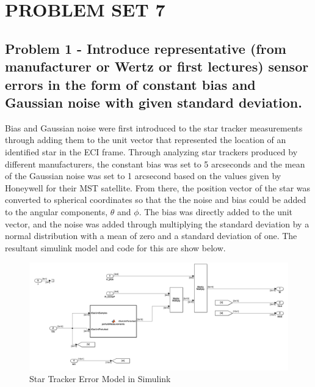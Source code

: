 \section{\Large PROBLEM SET 7}

\subsection{Problem 1 - Introduce representative (from manufacturer or Wertz or first lectures) sensor errors in the form of constant bias and Gaussian noise with given standard deviation.} \label{sec:hw7problem1}

Bias and Gaussian noise were first introduced to the star tracker measurements through adding them to the unit vector that represented the location of an identified star in the ECI frame. Through analyzing star trackers produced by different manufacturers, the constant bias was set to 5 arcseconds and the mean of the Gaussian noise was set to 1 arcsecond based on the values given by Honeywell for their MST satellite. From there, the position vector of the star was converted to spherical coordinates so that the the noise and bias could be added to the angular components, $\theta$ and $\phi$. The bias was directly added to the unit vector, and the noise was added through multiplying the standard deviation by a normal distribution with a mean of zero and a standard deviation of one. The resultant simulink model and code for this are show below. 

\begin{figure}[H]
    \centering
    \captionsetup{ justification = centering }
    \includegraphics[width = 15cm]{Images/PS7/starTrackerErrorSimulink.png}
    \caption{Star Tracker Error Model in Simulink}
    \label{fig:starTrackerErrorSimulink}
\end{figure}

